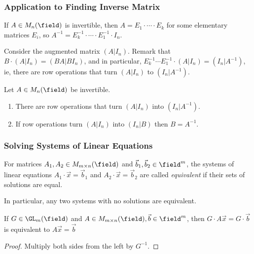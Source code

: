 \subsubsection{Application to Finding Inverse Matrix}

If $A \in M_{n}(\field)$ is invertible, then $A = E_1 \cdot \cdots \cdot E_k$ for some elementary matrices $E_i$, so $A^{-1} = E_k^{-1} \cdot \cdots \cdot E_1^{-1} \cdot I_n$.

Consider the augmented matrix $(A \vert I_n)$. Remark that $B \cdot (A \vert I_n) = (BA \vert BI_n)$, and in particular, $E_k^{-1}\cdots E_1^{-1}\cdot (A \vert I_n) = (I_n \vert A^{-1})$, ie, there are row operations that turn $(A \vert I_n)$ to $(I_n \vert A^{-1})$.

\begin{theorem}
    Let $A \in M_n(\field)$ be invertible.
    \begin{enumerate}
        \item There are row operations that turn $(A \vert I_n)$ into $(I_n \vert A^{-1})$.
        \item If row operations turn $(A \vert I_n)$ into $(I_n\vert B)$ then $B = A^{-1}$.
    \end{enumerate}
\end{theorem}

\subsubsection{Solving Systems of Linear Equations}

\begin{definition}
    For matrices $A_1, A_2 \in M_{m \times n}(\field)$ and $\vec{b}_1, \vec{b}_2 \in \field^m$, the systems of linear equations $A_1 \cdot \vec{x} = \vec{b}_1$ and $A_2 \cdot \vec{x} = \vec{b}_2$ are called \emph{equivalent} if their sets of solutions are equal. 
    
    In particular, any two systems with no solutions are equivalent.
\end{definition}
\begin{proposition}
    If $G \in \GL_m(\field)$ and $A \in M_{m \times n}(\field), \vec{b} \in \field^m$, then $G \cdot A \vec{x} = G \cdot \vec{b}$ is equivalent to $A \vec{x} = \vec{b}$
\end{proposition}

\begin{proof}
    Multiply both sides from the left by $G^{-1}$.
\end{proof}

